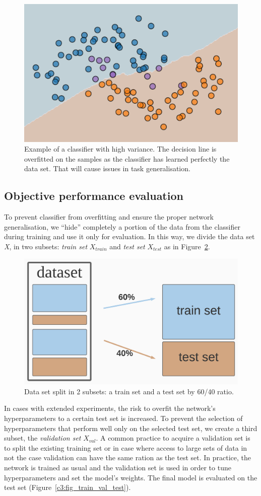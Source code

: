 \begin{figure}[h!]
    \centering  
    \includegraphics[width=.7\textwidth]{figures/chap3/ml/bias}
    \caption{Example of a classifier with high variance. The decision line is overfitted on the samples as the classifier has learned perfectly the data set. That will cause issues in task generalisation.}
    \label{c3:fig_variance}
\end{figure}

\subsection{Objective performance evaluation}

To prevent classifier from overfitting and ensure the proper network generalisation, we ``hide'' completely a portion of the data from the classifier during training and use it only for evaluation. In this way, we divide the data set \textit{X}, in two subsets: \textit{train set} $X_{train}$ and \textit{test set} $X_{test}$ as in Figure~\ref{c3:fig_train_test}.

\begin{figure}[h!]
    \centering  
    \includegraphics[width=.6\textwidth]{figures/chap3/ml/train_test}
    \caption{Data set split in 2 subsets: a train set and a test set by 60/40 ratio.}
    \label{c3:fig_train_test}
\end{figure}

In cases with extended experiments, the risk to overfit the network's hyperparameters to a certain test set is increased. To prevent the selection of hyperparameters that perform well only on the selected test set, we create a third subset, the \textit{validation set} $X_{val}$. 
A common practice to acquire a validation set is to split the existing training set or in case where access to large sets of data in not the case validation can have the same ration as the test set.
In practice, the network is trained as usual and the validation set is used in order to tune hyperparameters and set the model's weights. 
The final model is evaluated on the test set (Figure~\ref{c3:fig_train_val_test}).

